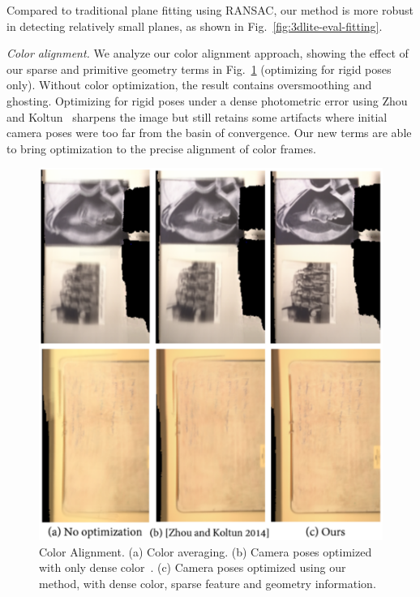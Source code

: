 Compared to traditional plane fitting using RANSAC, our method is more robust in detecting relatively small planes, as shown in Fig.~\ref{fig:3dlite-eval-fitting}.

\emph{Color alignment.}
We analyze our color alignment approach, showing the effect of our sparse and primitive geometry terms in Fig.~\ref{fig:3dlite-eval-align-rigid} (optimizing for rigid poses only).
Without color optimization, the result contains oversmoothing and ghosting. 
Optimizing for rigid poses under a dense photometric error using Zhou and Koltun~\cite{zhou2014color} sharpens the image but still retains some artifacts where initial camera poses were too far from the basin of convergence.
Our new terms are able to bring optimization to the precise alignment of color frames.

\begin{figure}
\begin{minipage}{0.49\linewidth}
\centering
\includegraphics[width=\linewidth]{3dlite/fig17.png}
\caption{Color Alignment. (a) Color averaging. (b) Camera poses optimized with only dense color~\cite{zhou2014color}. (c) Camera poses optimized using our method, with dense color, sparse feature and geometry information.}
\label{fig:3dlite-eval-align-rigid}
\end{minipage}

\end{figure}
